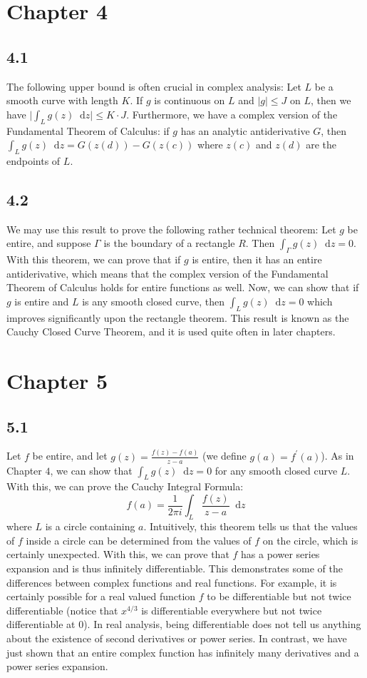 \documentclass[12pt]{article}
\newcommand*\diff{\mathop{}\!\mathrm{d}}
\begin{document}
\section*{Chapter 4}
\subsection*{4.1}
The following upper bound is often crucial in complex analysis: Let $L$ be a smooth curve with length $K$. If $g$ is continuous on $L$ and $\vert g \vert \leq J$ on $L$, then we have \(\vert \int_L g(z) \diff z \vert \leq K \cdot J\). Furthermore, we have a  complex version of the Fundamental Theorem of Calculus: if $g$ has an analytic antiderivative $G$, then \(\int_L g(z) \diff z = G(z(d)) - G(z(c))\) where $z(c)$ and $z(d)$ are the endpoints of $L$.
\subsection*{4.2}
We may use this result to prove the following rather technical theorem:
Let $g$ be entire, and suppose $\Gamma$ is the boundary of a rectangle $R$. Then \(\int_\Gamma g(z) \diff z = 0\).
With this theorem, we can prove that if $g$ is entire, then it has an entire antiderivative, which means that the complex version of the Fundamental Theorem of Calculus holds for entire functions as well. Now, we can show that if $g$ is entire and $L$ is any smooth closed curve, then \(\int_L g(z) \diff z = 0\) which improves significantly upon the rectangle theorem. This result is known as the Cauchy Closed Curve Theorem, and it is used quite often in later chapters.
\section*{Chapter 5}
\subsection*{5.1}
Let $f$ be entire, and let $g(z) = \frac{f(z) - f(a)}{z-a}$ (we define $g(a) = f^\prime(a)$). As in Chapter $4$, we can show that $\int_L g(z) \diff z = 0$ for any smooth closed curve $L$. With this, we can prove the Cauchy Integral Formula:
\[
f(a) = \frac{1}{2\pi i} \int_L \frac{f(z)}{z-a} \diff z
\]
where $L$ is a circle containing $a$. Intuitively, this theorem tells us that the values of $f$ inside a circle can be determined from the values of $f$ on the circle, which is certainly unexpected. With this, we can prove that $f$ has a power series expansion and is thus infinitely differentiable. This demonstrates some of the differences between complex functions and real functions. For example, it is certainly possible for a real valued function $f$ to be differentiable but not twice differentiable (notice that $x^{4/3}$ is differentiable everywhere but not twice differentiable at $0$). In real analysis, being differentiable does not tell us anything about the existence of second derivatives or power series. In contrast, we have just shown that an entire complex function has infinitely many derivatives and a power series expansion.
\end{document}
